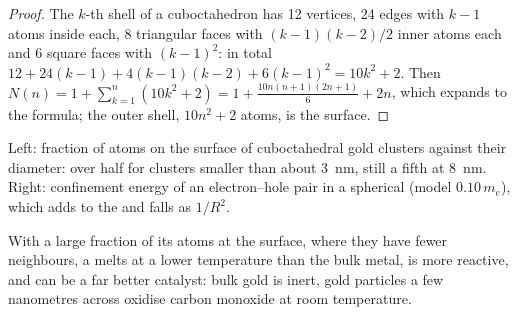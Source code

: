 \begin{proof}
The $k$-th shell of a cuboctahedron has 12 vertices, 24 edges with $k - 1$ atoms
inside each, 8 triangular faces with $(k - 1)(k - 2)/2$ inner atoms each and 6
square faces with $(k - 1)^2$: in total $12 + 24(k - 1) + 4(k - 1)(k - 2) + 6(k - 1)^2 = 10k^2 + 2$. Then
$N(n) = 1 + \sum_{k=1}^{n}(10k^2 + 2) = 1 + \frac{10n(n + 1)(2n + 1)}{6} + 2n$, which expands to the formula; the
outer shell, $10n^2 + 2$ atoms, is the surface.
\end{proof}

\begin{omfigure}

{\small Left: fraction of atoms on the surface of cuboctahedral gold clusters
against their diameter: over half for clusters smaller than about
\qty{3}{nm}, still a fifth at \qty{8}{nm}. Right: confinement energy of an
electron--hole pair in a spherical  (model  $0.10\,m_e$),
which adds to the  and falls as $1/R^2$.}
\end{omfigure}

With a large fraction of its atoms at the surface, where they have fewer
neighbours, a  melts at a lower temperature than the bulk metal,
is more reactive, and can be a far better catalyst: bulk gold is inert, gold
particles a few nanometres across oxidise carbon monoxide at room temperature.

